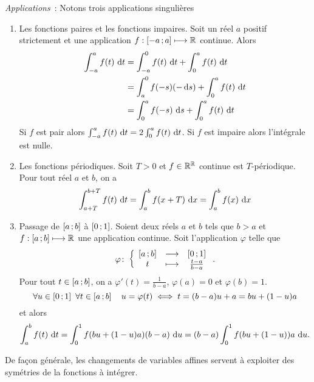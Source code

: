 \emph{Applications}~: Notons trois applications singulières
\begin{enumerate}
  \item Les fonctions paires et les fonctions impaires. Soit un réel \(a\)
    positif strictement et une application \(f : \left[ -a \, ; {} a \right]
    \longmapsto \mathbb{R}\) continue. Alors
    \begin{align*}
      \int_{-a}^a f(t)\,\mathop{}\mathopen{}\mathrm{d} t & = \int_{-a}^0 f(t)\,\mathop{}\mathopen{}\mathrm{d} t + \int_{0}^a
      f(t)\,\mathop{}\mathopen{}\mathrm{d} t \\
      & = \int_a^0 f(-s)(-\mathop{}\mathopen{}\mathrm{d} s) + \int_{0}^a f(t)\,\mathop{}\mathopen{}\mathrm{d} t \\
      & = \int_0^a f(-s)\,\mathop{}\mathopen{}\mathrm{d} s + \int_{0}^a f(t)\,\mathop{}\mathopen{}\mathrm{d} t \\
    \end{align*}
    Si \(f\) est pair alors \(\int_{-a}^a f(t)\,\mathop{}\mathopen{}\mathrm{d} t = 2 \int_{0}^a
    f(t)\,\mathop{}\mathopen{}\mathrm{d} t\). Si \(f\) est impaire alors l'intégrale est nulle.

  \item Les fonctions périodiques. Soit \(T >0\) et \(f \in \mathbb{R}^{\mathbb{R}}\) continue
    est \(T\)-périodique. Pour tout réel \(a\) et \(b\), on a
    \begin{equation}
      \int_{a+T}^{b+T} f(t)\,\mathop{}\mathopen{}\mathrm{d} t = \int_a^bf(x+T)\,\mathop{}\mathopen{}\mathrm{d} x =
      \int_a^bf(x)\,\mathop{}\mathopen{}\mathrm{d} x
    \end{equation}
  \item Passage de \(\left[ a \, ; {} b \right]\) à \(\left[ 0 \, ; {} 1 \right]\). Soient
    deux réels \(a\) et \(b\) tels que \(b>a\) et \(f:\left[ a \, ; {} b \right]
    \longmapsto \mathbb{R}\) une application continue. Soit l'application \(\varphi\)
    telle que
    \begin{equation}
      \varphi\colon\left\{\begin{array}{ccc}\left[ a \, ; {} b \right] & \longrightarrow &\left[ 0 \, ; {} 1 \right]\\t & \longmapsto & \frac{t-a}{b-a}\end{array}\right..
    \end{equation}
    Pour tout \(t \in \left[ a \, ; {} b \right]\), on a \(\varphi'(t) =
    \frac{1}{b-a}\), \(\varphi(a) = 0\) et \(\varphi(b) = 1\).
    \begin{equation}
      \forall u \in \left[ 0 \, ; {} 1 \right] \ \forall t \in \left[ a \, ; {} b \right]
      \quad u = \varphi(t) \iff t = (b-a)u +a = bu +(1-u)a
    \end{equation}
    et alors
    \begin{equation}
      \int_a^b f(t)\,\mathop{}\mathopen{}\mathrm{d} t = \int_0^1 f(bu+(1-u)a)(b-a)\,\mathop{}\mathopen{}\mathrm{d} u = (b-a)
      \int_0^1 f(bu+(1-u))a\,\mathop{}\mathopen{}\mathrm{d} u.
    \end{equation}
\end{enumerate}

De façon générale, les changements de variables affines servent à exploiter des
symétries de la fonctions à intégrer.

